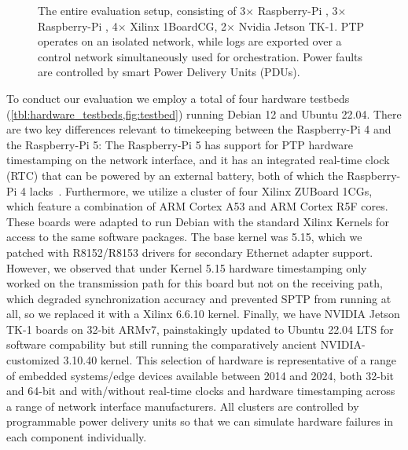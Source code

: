 \begin{figure}
    \caption{The entire evaluation setup, consisting of 3$\times$ Raspberry-Pi {}, 3$\times$ Raspberry-Pi {}, 4$\times$ {\sffamily X}ilinx 1BoardCG, 2$\times$ {\sffamily N}vidia Jetson TK-1. PTP operates on an isolated network, while logs are exported over a control network simultaneously used for orchestration. Power faults are controlled by smart Power Delivery Units (PDUs).}
    \label{fig:testbed}
\end{figure}

To conduct our evaluation we employ a total of four hardware testbeds (\cref{tbl:hardware_testbeds,fig:testbed}) running Debian 12 and Ubuntu 22.04.
There are two key differences relevant to timekeeping between the Raspberry-Pi 4 and the Raspberry-Pi 5: The Raspberry-Pi 5 has support for PTP hardware timestamping on the network interface, and it has an integrated real-time clock (RTC) that can be powered by an external battery, both of which the Raspberry-Pi 4 lacks~\cite{raspberry-pi-datasheets}. Furthermore, we utilize a cluster of four Xilinx ZUBoard 1CGs, which feature a combination of ARM Cortex A53 and ARM Cortex R5F cores. These boards were adapted to run Debian with the standard Xilinx Kernels for access to the same software packages. The base kernel was 5.15, which we patched with R8152/R8153 drivers for secondary Ethernet adapter support. However, we observed that under Kernel 5.15 hardware timestamping only worked on the transmission path for this board but not on the receiving path, which degraded synchronization accuracy and prevented SPTP from running at all, so we replaced it with a Xilinx 6.6.10 kernel. Finally, we have NVIDIA Jetson TK-1 boards on 32-bit ARMv7, painstakingly updated to Ubuntu 22.04 LTS for software compability but still running the comparatively ancient NVIDIA-customized 3.10.40 kernel. This selection of hardware is representative of a range of embedded systems/edge devices available between 2014 and 2024, both 32-bit and 64-bit and with/without real-time clocks and hardware timestamping across a range of network interface manufacturers. All clusters are controlled by programmable power delivery units so that we can simulate hardware failures in each component individually.

